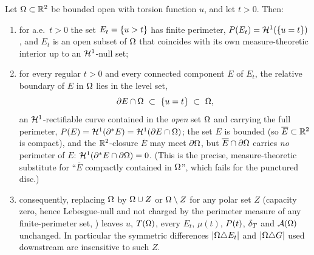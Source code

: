 \begin{lemma}
\label{lem:containment}
Let $\Omega\subset\mathbb{R}^2$ be bounded open with torsion function $u$, and let
$t>0$. Then:
\begin{enumerate}[label=\textup{(\roman*)},leftmargin=2.4em]
\item\label{it:cont-fp} for a.e.\ $t>0$ the set $E_t=\left\{u>t\right\}$ has finite
perimeter, $P(E_t)=\mathcal{H}^1(\left\{u=t\right\})$, and $E_t$ is an open subset of
$\Omega$ that coincides with its own measure-theoretic interior up to an
$\mathcal{H}^1$-null set;
\item\label{it:cont-far} for every regular $t>0$ and every connected
component $E$ of $E_t$, the relative boundary of $E$ in $\Omega$ lies in the
level set,
\[
   \partial E\cap\Om\ \subset\ \set{u=t}\ \subset\ \Om,
\]
an $\mathcal{H}^1$-rectifiable curve contained in the \emph{open} set $\Omega$ and
carrying the full perimeter, $P(E)=\mathcal{H}^1(\partial^*E)=\mathcal{H}^1(\partial E\cap
\Omega)$; the set $E$ is bounded \textup{(}so $\overline E\subset\mathbb{R}^2$ is
compact\textup{)}, and the $\mathbb{R}^2$-closure $\overline E$ may meet
$\partial\Omega$, but $\overline E\cap\partial\Omega$ carries \emph{no} perimeter
of $E$: $\mathcal{H}^1(\partial^*E\cap\partial\Omega)=0$. \textup{(}This is the precise,
measure-theoretic substitute for ``$\overline E$ compactly contained in
$\Omega$'', which fails for the punctured disc.\textup{)}
\item\label{it:cont-polar} consequently, replacing $\Omega$ by
$\Omega\cup Z$ or $\Omega\setminus Z$ for any polar set $Z$ \textup{(}capacity
zero, hence Lebesgue-null and not charged by the perimeter measure of any
finite-perimeter set, \cite[Thm.~4.5, \S4.7]{EvansGariepy2015}\textup{)}
leaves $u$, $T(\Omega)$, every $E_t$, $\mu(t)$, $P(t)$, $\delta_T$ and $\mathcal{A}(\Omega)$
unchanged. In particular the symmetric differences $|\Omega\triangle E_t|$ and
$|\Omega\triangle G|$ used downstream are insensitive to such $Z$.
\end{enumerate}
\end{lemma}

